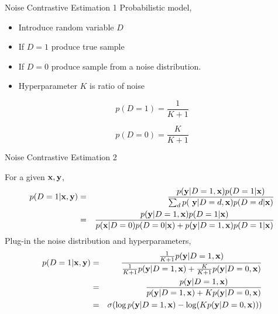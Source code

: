 \documentclass{beamer}
\begin{document}
\begin{frame}{Noise Contrastive Estimation 1}
  Probabilistic model,
  \begin{itemize}
  \item Introduce random variable $D$
  \item If $D=1$ produce true sample
  \item If $D=0$ produce sample from a noise distribution.
  \item Hyperparameter $K$ is ratio of noise
  \end{itemize}


  \[p(D=1) =   \frac{1}{K+1}\]

  \[p(D=0) = \frac{K}{K+1}\]
   
\end{frame}

\begin{frame}{Noise Contrastive Estimation 2}

  For a given $\mathbf{x}, \mathbf{y}$, 
  \begin{eqnarray*}
  p(D=1 | \mathbf{x}, \mathbf{y}) &=&  \frac{p(\mathbf{y}|D=1, \mathbf{x}) p(D=1 | \mathbf{x})}{\sum_{d} p(\ \mathbf{y}|D=d, \mathbf{x} ) p(D=d | \mathbf{x}) } \\
  &=&  \frac{p( \mathbf{y}|D=1, \mathbf{x}) p(D=1 | \mathbf{x})}{p(\mathbf{x}|D=0)p(D=0 | \mathbf{x}) +  p(\mathbf{y}|D=1,\mathbf{x})  p(D=1 | \mathbf{x}) }
  \end{eqnarray*}
  Plug-in the noise distribution and hyperparameters,
  \begin{eqnarray*}
    p(D=1 | \mathbf{x}, \mathbf{y}) &=& \frac{\frac{1}{K+1} p(\mathbf{y}|D=1, \mathbf{x})}{\frac{1}{K+1} p(\mathbf{y}|D=1, \mathbf{x}) + \frac{K}{K+1} p(\mathbf{y}|D=0, \mathbf{x}) }\\
    &=& \frac{p(\mathbf{y}|D=1, \mathbf{x})}{p(\mathbf{y}|D=1, \mathbf{x}) + K p(\mathbf{y}|D=0, \mathbf{x}) } \\
    &=& \sigma(\log p(\mathbf{y}|D=1, \mathbf{x}) - \log(K p(\mathbf{y}|D=0, \mathbf{x}))) \\  
  \end{eqnarray*}
\end{frame}
\end{document}
